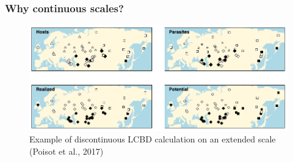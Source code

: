 \documentclass[10pt]{beamer}
\begin{document}
\begin{frame}
  \frametitle{Why continuous scales?}
  \begin{figure}
    \centering
    \hspace*{-0cm}\includegraphics[scale=0.35]{fig/lcbd_Pois2017.png}
    \caption{Example of discontinuous LCBD calculation on an extended scale (Poisot et al., 2017)}
  \end{figure}
\end{frame}
\end{document}
